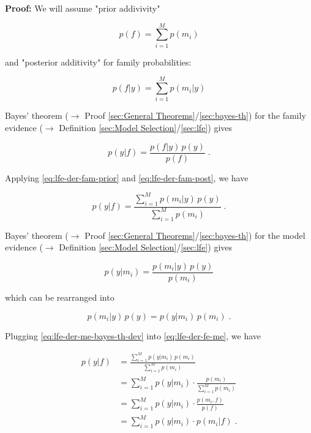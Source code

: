 \documentclass[a4paper,12pt,twoside]{book}
\begin{document}
\vspace{1em}
\textbf{Proof:} We will assume "prior addivivity"

\begin{equation} \label{eq:lfe-der-fam-prior}
p(f) = \sum_{i=1}^M p(m_i)
\end{equation}

and "posterior additivity" for family probabilities:

\begin{equation} \label{eq:lfe-der-fam-post}
p(f|y) = \sum_{i=1}^M p(m_i|y)
\end{equation}

Bayes' theorem ($\rightarrow$ Proof \ref{sec:General Theorems}/\ref{sec:bayes-th}) for the family evidence ($\rightarrow$ Definition \ref{sec:Model Selection}/\ref{sec:lfe}) gives

\begin{equation} \label{eq:lfe-der-fe-bayes-th}
p(y|f) = \frac{p(f|y) \, p(y)}{p(f)} \; .
\end{equation}

Applying \eqref{eq:lfe-der-fam-prior} and \eqref{eq:lfe-der-fam-post}, we have

\begin{equation} \label{eq:lfe-der-fe-me}
p(y|f) = \frac{\sum_{i=1}^M p(m_i|y) \, p(y)}{\sum_{i=1}^M p(m_i)} \; .
\end{equation}

Bayes' theorem ($\rightarrow$ Proof \ref{sec:General Theorems}/\ref{sec:bayes-th}) for the model evidence ($\rightarrow$ Definition \ref{sec:Model Selection}/\ref{sec:lfe}) gives

\begin{equation} \label{eq:lfe-der-me-bayes-th}
p(y|m_i) = \frac{p(m_i|y) \, p(y)}{p(m_i)}
\end{equation}

which can be rearranged into

\begin{equation} \label{eq:lfe-der-me-bayes-th-dev}
p(m_i|y) \, p(y) = p(y|m_i) \, p(m_i) \; .
\end{equation}

Plugging \eqref{eq:lfe-der-me-bayes-th-dev} into \eqref{eq:lfe-der-fe-me}, we have

\begin{equation} \label{eq:lfe-der-fe-marg-qed}
\begin{split}
p(y|f) &= \frac{\sum_{i=1}^M p(y|m_i) \, p(m_i)}{\sum_{i=1}^M p(m_i)} \\
&= \sum_{i=1}^M p(y|m_i) \cdot \frac{p(m_i)}{\sum_{i=1}^M p(m_i)} \\
&= \sum_{i=1}^M p(y|m_i) \cdot \frac{p(m_i,f)}{p(f)} \\
&= \sum_{i=1}^M p(y|m_i) \cdot p(m_i|f) \; .
\end{split}
\end{equation}
\end{document}
